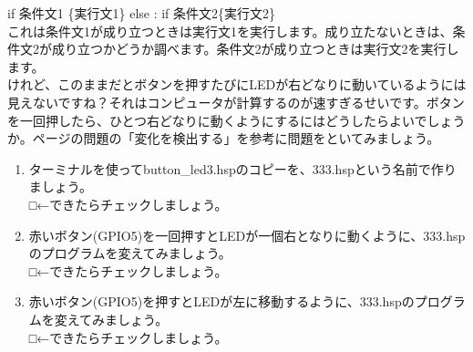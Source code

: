 if 条件文1 \{実行文1\} else : if 条件文2\{実行文2\}\\
これは条件文1が成り立つときは実行文1を実行します。成り立たないときは、条件文2が成り立つかどうか調べます。条件文2が成り立つときは実行文2を実行します。 \\

けれど、このままだとボタンを押すたびにLEDが右どなりに動いているようには見えないですね？それはコンピュータが計算するのが速すぎるせいです。ボタンを一回押したら、ひとつ右どなりに動くようにするにはどうしたらよいでしょうか。\pageref{button_led2_toi}ページの問題の「変化を検出する」を参考に問題をといてみましょう。\\

\begin{tcolorbox}[title=\useOmetoi]
\begin{enumerate}
\item ターミナルを使ってbutton\_led3.hspのコピーを、333.hspという名前で作りましょう。\\
□←できたらチェックしましょう。
\item 赤いボタン(GPIO5)を一回押すとLEDが一個右となりに動くように、333.hspのプログラムを変えてみましょう。\\
□←できたらチェックしましょう。
\item 赤いボタン(GPIO5)を押すとLEDが左に移動するように、333.hspのプログラムを変えてみましょう。\\
□←できたらチェックしましょう。
\end{enumerate}
\end{tcolorbox}
